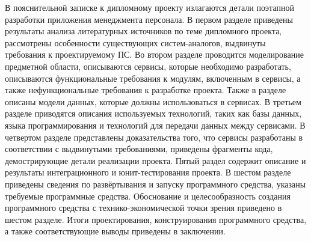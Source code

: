 В пояснительной записке к дипломному проекту излагаются детали поэтапной разработки приложения менеджмента персонала. В первом разделе приведены результаты анализа литературных источников по теме дипломного проекта, рассмотрены особенности существующих систем-аналогов, выдвинуты требования к проектируемому ПС. Во втором разделе проводится моделирование предметной области, описываются сервисы, которые необходимо разработать, описываются функциональные требования к модулям, включенным в сервисы, а также нефункциональные требования к разработке проекта. Также в разделе описаны модели данных, которые должны использоваться в сервисах. В третьем разделе приводятся описания используемых технологий, таких как базы данных, языка программирования и технологий для передачи данных между сервисами. В четвертом разделе представлены доказательства того, что сервисы разработаны в соответствии с выдвинутыми требованиями, приведены фрагменты кода, демострирующие детали реализации проекта. Пятый раздел содержит описание и результаты интеграционного и юнит-тестирования проекта. В шестом разделе приведены сведения по развёртывания и запуску программного средства, указаны требуемые программные средства. Обоснование и целесообразность создания программного средства с технико-экономической точки зрения приведено в шестом разделе. Итоги проектирования, конструирования программного средства, а также соответствующие выводы приведены в заключении.

